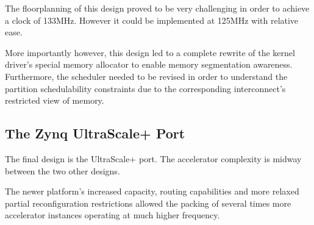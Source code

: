 The floorplanning of this design proved to be very challenging in order to achieve a clock of 133MHz.
However it could be implemented at 125MHz with relative ease. 

More importantly however, this design led to a complete rewrite of the kernel driver's special memory allocator
to enable memory segmentation awareness. Furthermore, the scheduler needed to be revised in order to understand
the partition schedulability constraints due to the corresponding interconnect's restricted view of memory.


\subsection{The Zynq UltraScale+ Port}

The final design is the UltraScale+ port.
The accelerator complexity is midway between the two other designs. 

The newer platform's increased capacity, routing capabilities 
and more relaxed partial reconfiguration restrictions
allowed the packing of several times more accelerator instances
operating at much higher frequency.


